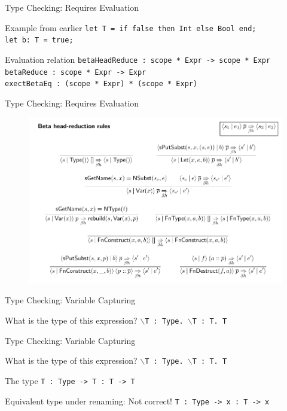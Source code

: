 \documentclass[aspectratio=43]{beamer}
\begin{document}
\begin{frame}[fragile]{Type Checking: Requires Evaluation}
	\begin{exampleblock}{Example from earlier}
		\texttt{let T = if false then Int else Bool end;\\let b: T = true;}
	\end{exampleblock}
	\begin{block}{Evaluation relation} 
		\texttt{betaHeadReduce : scope * Expr -> scope * Expr} \\
		\texttt{betaReduce : scope * Expr -> Expr} \\
		\texttt{exectBetaEq : (scope * Expr) * (scope * Expr)}
	\end{block}
\end{frame}

\begin{frame}[fragile]{Type Checking: Requires Evaluation}
	\begin{figure}
		\includegraphics[width=0.9\linewidth]{screenshot001}
	\end{figure}
	
\end{frame}

\begin{frame}[fragile]{Type Checking: Variable Capturing}
	\begin{exampleblock}{What is the type of this expression?}
		\texttt{$\backslash$T : Type. $\backslash$T : T. T}
	\end{exampleblock}
\end{frame}

\begin{frame}[fragile]{Type Checking: Variable Capturing}
	\begin{exampleblock}{What is the type of this expression?}
		\texttt{$\backslash$T : Type. $\backslash$T : T. T}
	\end{exampleblock}
	
	\begin{block}{The type}
		\texttt{T : Type -> T : T -> T}
	\end{block}
	
	\begin{block}{Equivalent type under renaming: Not correct!}
		\texttt{T : Type -> x : T -> x}
	\end{block}
\end{frame}
\end{document}
